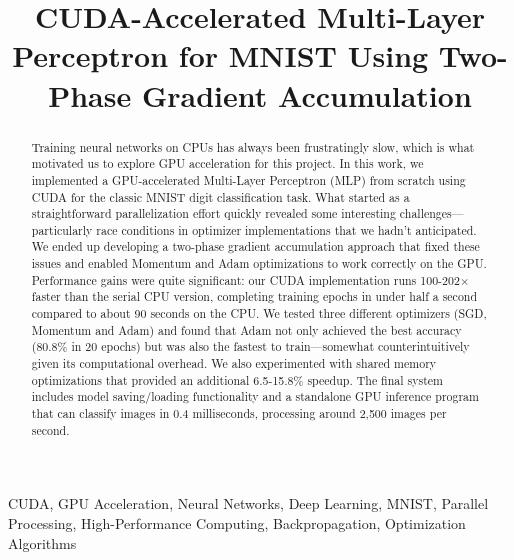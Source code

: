 \documentclass[conference]{IEEEtran}
\begin{document}
\title{CUDA-Accelerated Multi-Layer Perceptron for MNIST Using Two-Phase Gradient Accumulation}

\author{
\and
{}
}


\maketitle

\begin{abstract}
Training neural networks on CPUs has always been frustratingly slow, which is what motivated us to explore GPU acceleration for this project. In this work, we implemented a GPU-accelerated Multi-Layer Perceptron (MLP) from scratch using CUDA for the classic MNIST digit classification task. What started as a straightforward parallelization effort quickly revealed some interesting challenges—particularly race conditions in optimizer implementations that we hadn't anticipated. We ended up developing a two-phase gradient accumulation approach that fixed these issues and enabled Momentum and Adam optimizations to work correctly on the GPU. Performance gains were quite significant: our CUDA implementation runs 100-202× faster than the serial CPU version, completing training epochs in under half a second compared to about 90 seconds on the CPU. We tested three different optimizers (SGD, Momentum and Adam) and found that Adam not only achieved the best accuracy (80.8\% in 20 epochs) but was also the fastest to train—somewhat counterintuitively given its computational overhead. We also experimented with shared memory optimizations that provided an additional 6.5-15.8\% speedup. The final system includes model saving/loading functionality and a standalone GPU inference program that can classify images in 0.4 milliseconds, processing around 2,500 images per second.
\end{abstract}

\begin{IEEEkeywords}
CUDA, GPU Acceleration, Neural Networks, Deep Learning, MNIST, Parallel Processing, High-Performance Computing, Backpropagation, Optimization Algorithms
\end{IEEEkeywords}
\end{document}
